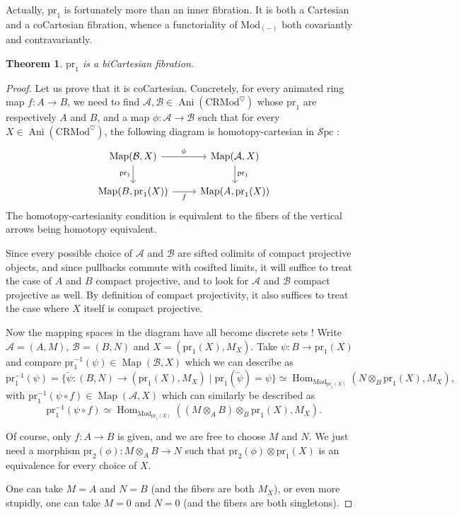 \documentclass[11pt]{article}
\newtheorem{theorem}{Theorem}[section]
\theoremstyle{definition}
\newcommand{\Ani}{\operatorname{Ani}}
\newcommand{\CRMod}{\mathrm{CRMod}}
\newcommand{\heart}{\heartsuit}
\newcommand{\Hom}{\operatorname{Hom}}
\newcommand{\Map}{\operatorname{Map}}
\newcommand{\Mod}{\mathrm{Mod}}
\newcommand{\pr}{\mathrm{pr}}
\newcommand{\Spc}{\mathcal{S}\mathrm{pc}}
\begin{document}
Actually, $\pr_1$ is fortunately more than an inner fibration.
It is both a Cartesian and a coCartesian fibration, whence a functoriality of $\Mod_(-)$ both covariantly and contravariantly.
\begin{theorem}
    $\pr_1$ is a biCartesian fibration.
\end{theorem}
\begin{proof}
    Let us prove that it is coCartesian.
    Concretely, for every animated ring map $f : A \to B$, we need to find $\mathcal{A}, \mathcal{B} \in \Ani(\CRMod^{\heart})$ whose $\pr_1$ are respectively $A$ and $B$, and a map $\phi : \mathcal{A} \to \mathcal{B}$ such that for every $X \in \Ani(\CRMod^{\heart})$, the following diagram is homotopy-cartesian in $\Spc$ :
    \[\begin{tikzcd}
        {\Map(\mathcal{B}, X)} & {\Map(\mathcal{A}, X)} \\
        {\Map(B, \pr_1(X))} & {\Map(A, \pr_1(X))}
        \arrow["\phi", from=1-1, to=1-2]
        \arrow["{\pr_1}"', from=1-1, to=2-1]
        \arrow["{\pr_1}", from=1-2, to=2-2]
        \arrow["f"', from=2-1, to=2-2]
    \end{tikzcd}\]
    The homotopy-cartesianity condition is equivalent to the fibers of the vertical arrows being homotopy equivalent.

    Since every possible choice of $\mathcal{A}$ and $\mathcal{B}$ are sifted colimits of compact projective objects, and since pullbacks commute with cosifted limits, it will suffice to treat the case of $A$ and $B$ compact projective, and to look for $\mathcal{A}$ and $\mathcal{B}$ compact projective as well.
    By definition of compact projectivity, it also suffices to treat the case where $X$ itself is compact projective.

    Now the mapping spaces in the diagram have all become discrete sets !
    Write $\mathcal{A} = (A, M)$, $\mathcal{B} = (B, N)$ and $X = (\pr_1(X), M_X)$.
    Take $\psi : B \to \pr_1(X)$ and compare $\pr_1^{-1}(\psi) \in \Map(\mathcal{B}, X)$ which we can describe as
    \[
        \pr_1^{-1}(\psi) = \{\tilde{\psi} : (B, N) \to (\pr_1(X), M_X) \mid \pr_1(\tilde{\psi}) = \psi\} \simeq \Hom_{\Mod_{\pr_1(X)}}(N \otimes_B \pr_1(X), M_X),
    \]
    with $\pr_1^{-1}(\psi \circ f) \in \Map(\mathcal{A}, X)$ which can similarly be described as
    \[
        \pr_1^{-1}(\psi \circ f) \simeq \Hom_{\Mod_{\pr_1(X)}}((M \otimes_A B) \otimes_B \pr_1(X), M_X).
    \]
    
    Of course, only $f : A \to B$ is given, and we are free to choose $M$ and $N$.
    We just need a morphism $\pr_2(\phi) : M \otimes_A B \to N$ such that $\pr_2(\phi) \otimes \pr_1(X)$ is an equivalence for every choice of $X$.

    One can take $M = A$ and $N = B$ (and the fibers are both $M_X$), or even more stupidly, one can take $M = 0$ and $N = 0$ (and the fibers are both singletons).
\end{proof}
\end{document}
